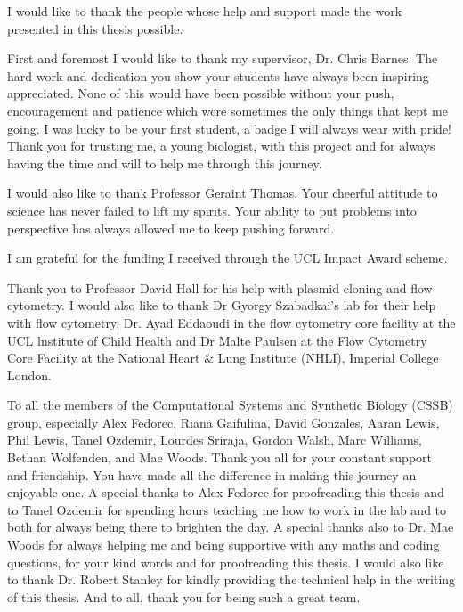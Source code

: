 \documentclass[]{phdthesis}
\begin{document}
\begin{acknowledgements}

I would like to thank the people whose help and support made the work presented in this thesis possible.


First and foremost I would like to thank my supervisor, Dr. Chris Barnes. The hard work and dedication you show your students have always been inspiring appreciated. None of this would have been possible without your push, encouragement and patience which were sometimes the only things that kept me going. I was lucky to be your first student, a badge I will always wear with pride! Thank you for  trusting me, a young biologist, with this project and for always having the time and will to help me through this journey.

I would also like to thank Professor Geraint Thomas. Your cheerful attitude to science has never failed to lift my spirits. Your ability to put problems into perspective has always allowed me to keep pushing forward. 

I am grateful for the funding I received through the UCL Impact Award scheme.

Thank you to Professor David Hall for his help with plasmid cloning and flow cytometry. I would also like to thank Dr Gyorgy Szabadkai's lab for their help with flow cytometry, Dr. Ayad Eddaoudi in the flow cytometry core facility at the UCL lnstitute of Child Health and Dr Malte Paulsen at the Flow Cytometry Core Facility at the National Heart \& Lung Institute (NHLI), Imperial College London. 

To all the members of the Computational Systems and Synthetic Biology (CSSB) group, especially Alex Fedorec, Riana Gaifulina, David Gonzales, Aaran Lewis, Phil Lewis, Tanel Ozdemir, Lourdes Sriraja, Gordon Walsh, Marc Williams, Bethan Wolfenden, and Mae Woods. Thank you all for your constant support and friendship. You have made all the difference in making this journey an enjoyable one. A special thanks to Alex Fedorec for proofreading this thesis and to Tanel Ozdemir for spending hours teaching me how to work in the lab and to both for always being there to brighten the day. A special thanks also to Dr. Mae Woods for always helping me and being supportive with any maths and coding questions, for your kind words and for proofreading this thesis. I would also like to thank Dr. Robert Stanley for kindly providing the technical help in the writing of this thesis. And to all, thank you for being such a great team. 



\end{acknowledgements}
\end{document}
